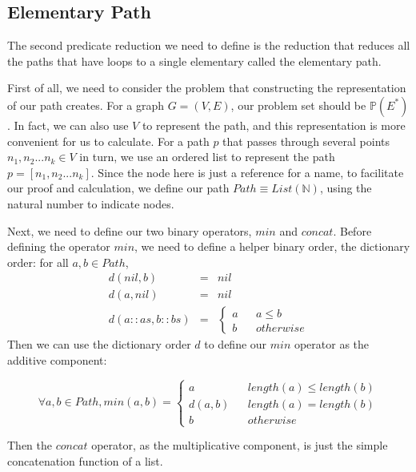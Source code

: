 \documentclass[a4paper,12pt,twoside,openright]{report}
\newcommand{\e}[2]{
\begin{equation}
  \label{#1} 
  #2
\end{equation}
}
\begin{document}
\subsection{Elementary Path}
The second predicate reduction we need to define is the reduction that reduces all the paths that have loops to a single elementary called the elementary path. 

First of all, we need to consider the problem that constructing the representation of our path creates.  For a graph $G = (V,E)$, our problem set should be $\mathbb{P}(E^*)$. In fact, we can also use $V$ to represent the path, and this representation is more convenient for us to calculate. For a path $p$ that passes through several points $n_1,n_2 ... n_k \in V$ in turn, we use an ordered list to represent the path $p = [n_1,n_2 ... n_k]$. 
Since the node here is just a reference for a name, to facilitate our proof and calculation, we define our path $Path \equiv List(\mathbb{N})$, using the natural number to indicate nodes.

Next, we need to define our two binary operators, $min$ and $concat$. 
Before defining the operator $min$, we need to define a helper binary order, the dictionary order: for all  $a,b \in Path$,
\[
\begin{array}{rcl} 
d(nil,b) & = & nil\\
d(a,nil) & = & nil\\
d(a::as,b::bs) & = & 
\left\{
\begin{aligned}
a &  & a \leq b \\
b &  & otherwise
\end{aligned}
\right.
\end{array}
\] 
Then we can use the dictionary order $d$ to define our $min$ operator as the additive component: 
\e{pf:def:elementary_path_min}{\forall a,b \in Path, min(a,b) = \left\{
\begin{aligned}
a &  & length(a) \leq length(b) \\
d(a,b) &  & length(a) = length(b) \\
b &  & otherwise 
\end{aligned}
\right.}
Then the $concat$ operator, as the multiplicative component, is just the simple concatenation function of a list.
\end{document}
